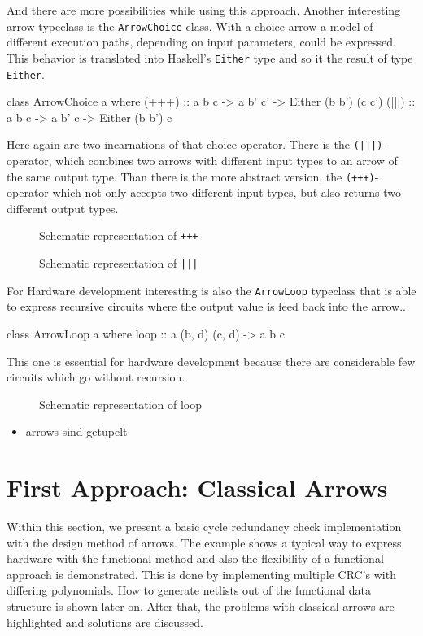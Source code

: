 \documentclass[9pt,final,a4paper,leqno]{article}
\newcommand{\xfig}[4][0.9] {%
    \begin{figure}[ht]
        \begin{center}
            \graphicspath{{./}{Images/}}
            \scalebox{#1}{%
                
            }
            \caption{\label{#4} #3}
        \end{center}
    \end{figure}
}
\newcommand{\hs}[1]{\mbox{\lstinline[basicstyle=\color{textgray}]!#1!}}
\begin{document}
\par
And there are more possibilities while using this approach. Another interesting arrow typeclass is the \hs{ArrowChoice} class. With a choice
arrow a model of different execution paths, depending on input parameters, could be expressed. This behavior is translated into Haskell's
\hs{Either} type and so it the result of type \hs{Either}. 

\begin{haskell}[]
class ArrowChoice a where
  (+++) :: a b c -> a b' c' -> Either (b b') (c c')
  (|||) :: a b c -> a b' c  -> Either (b b')  c 
\end{haskell}

Here again are two incarnations of that choice-operator. There is the \hs{(|||)}-operator, which combines two arrows with different input
types to an arrow of the same output type. Than there is the more abstract version, the \hs{(+++)}-operator which not only accepts two
different input types, but also returns two different output types.  

\xfig[.8]{ArrowPlPlPl}{Schematic representation of \hs{+++}}{figure:plplpl}
\xfig[.8]{ArrowPiPiPi}{Schematic representation of \hs{|||}}{figure:pipipi}

\par
For Hardware development interesting is also the \hs{ArrowLoop} typeclass that is able to express recursive circuits where the output value
is feed back into the arrow..
\begin{haskell}[]
class ArrowLoop a where
  loop :: a (b, d) (c, d) -> a b c
\end{haskell}

This one is essential for hardware development because there are considerable few circuits which go without recursion. 

\xfig[.8]{ArrowLp}{Schematic representation of loop}{figure:loop}



\begin{itemize}
  \item arrows sind getupelt
\end{itemize}



\section{First Approach: Classical Arrows}
Within this section, we present a basic cycle redundancy check implementation with the design method of arrows. The example shows a typical
way to express hardware with the functional method and also the flexibility of a functional approach is demonstrated. This is done by
implementing multiple CRC's with differing polynomials. How to generate netlists out of the functional data structure is shown later on.
After that, the problems with classical arrows are highlighted and solutions are discussed.
\end{document}
